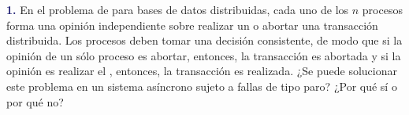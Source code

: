 \newpage\textbf{\textcolor{MidnightBlue}{1.}}
En el problema de  para bases de datos distribuidas, cada uno
de los $n$ procesos forma una opinión independiente sobre realizar un 
o abortar una transacción distribuida. Los procesos deben tomar una decisión consistente,
de modo que si la opinión de un sólo proceso es abortar, entonces, la transacción es
abortada y si la opinión es realizar el , entonces, la transacción es
realizada. ¿Se puede solucionar este problema en un sistema asíncrono sujeto a fallas de
tipo paro? ¿Por qué sí o por qué no?

